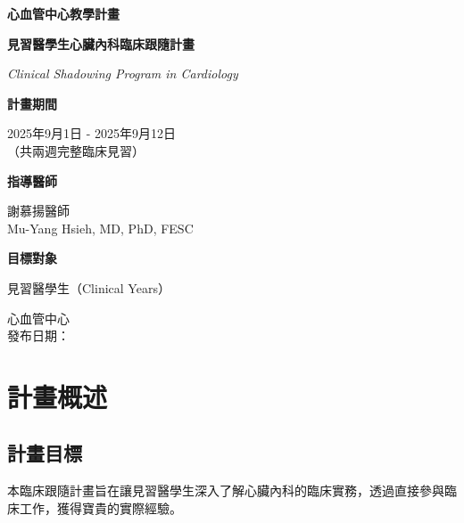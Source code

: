 \documentclass[12pt,a4paper]{article}
\newcommand{\mydate}{\DTMtoday}
\begin{document}
\begin{titlepage}
    \centering
    {\LARGE\textcolor{emergency_red}{\textbf{心血管中心教學計畫}}\par}
    \vspace{1cm}
    {\huge\bfseries 見習醫學生心臟內科臨床跟隨計畫\par}
    \vspace{0.5cm}
    {\Large\textcolor{emergency_blue}{\textit{Clinical Shadowing Program in Cardiology}}\par}
    \vspace{1cm}
    
    \begin{tcolorbox}[
        colback=emergency_blue!5!white,
        colframe=emergency_blue,
        width=0.8\textwidth,
        arc=10pt,
        boxrule=1pt
    ]
    \centering
    {\large\textbf{計畫期間}\par}
    \vspace{0.3cm}
    2025年9月1日 - 2025年9月12日\\
    （共兩週完整臨床見習）\\
    \vspace{0.5cm}
    {\large\textbf{指導醫師}\par}
    \vspace{0.3cm}
    謝慕揚醫師\\
    Mu-Yang Hsieh, MD, PhD, FESC\\
    \vspace{0.5cm}
    {\large\textbf{目標對象}\par}
    \vspace{0.3cm}
    見習醫學生（Clinical Years）
    \end{tcolorbox}

    \vfill
    
    {\large 心血管中心\\ 發布日期：\mydate}
    
    \vspace{0.5cm}
\end{titlepage}

\newpage
\tableofcontents
\newpage

\section{計畫概述}

\subsection{計畫目標}
本臨床跟隨計畫旨在讓見習醫學生深入了解心臟內科的臨床實務，透過直接參與臨床工作，獲得寶貴的實際經驗。
\end{document}
